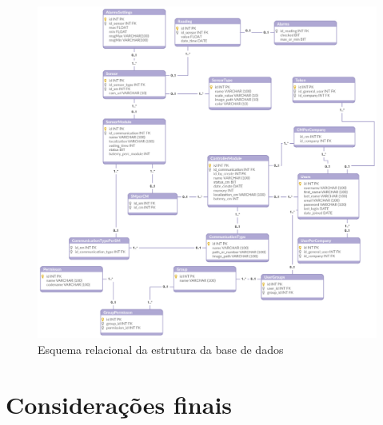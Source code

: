 \begin{figure}[!htb]
	\centering
	\includegraphics[width=\linewidth]{esquemas/database_tese.pdf}
	\caption{Esquema relacional da estrutura da base de dados}
	\label{esquemarelacional}
\end{figure}








\newpage








\section{Considerações finais}